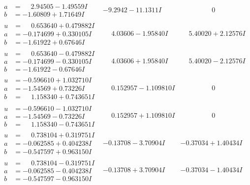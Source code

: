 \documentclass[1p]{elsarticle_modified}
\theoremstyle{definition}
\begin{document}
$$\begin{array}{c|c|c}
\begin{aligned}
a &= \phantom{-}2.94505 - 1.49559 I \\
b &= -1.60809 + 1.71649 I\end{aligned}
 & -9.2942 - 11.1311 I & \phantom{-0.000000 } 0 \\ \hline\begin{aligned}
u &= \phantom{-}0.653640 + 0.479882 I \\
a &= -0.174699 + 0.330105 I \\
b &= -1.61922 + 0.67646 I\end{aligned}
 & \phantom{-}4.03606 - 1.95840 I & \phantom{-}5.40020 + 2.12576 I \\ \hline\begin{aligned}
u &= \phantom{-}0.653640 - 0.479882 I \\
a &= -0.174699 - 0.330105 I \\
b &= -1.61922 - 0.67646 I\end{aligned}
 & \phantom{-}4.03606 + 1.95840 I & \phantom{-}5.40020 - 2.12576 I \\ \hline\begin{aligned}
u &= -0.596610 + 1.032710 I \\
a &= -1.54569 + 0.73226 I \\
b &= \phantom{-}1.158340 + 0.743651 I\end{aligned}
 & \phantom{-}0.152957 - 1.109810 I & \phantom{-0.000000 } 0 \\ \hline\begin{aligned}
u &= -0.596610 - 1.032710 I \\
a &= -1.54569 - 0.73226 I \\
b &= \phantom{-}1.158340 - 0.743651 I\end{aligned}
 & \phantom{-}0.152957 + 1.109810 I & \phantom{-0.000000 } 0 \\ \hline\begin{aligned}
u &= \phantom{-}0.738104 + 0.319751 I \\
a &= -0.062585 + 0.404238 I \\
b &= -0.547597 + 0.963150 I\end{aligned}
 & -0.13708 - 3.70904 I & -0.37034 + 1.40434 I \\ \hline\begin{aligned}
u &= \phantom{-}0.738104 - 0.319751 I \\
a &= -0.062585 - 0.404238 I \\
b &= -0.547597 - 0.963150 I\end{aligned}
 & -0.13708 + 3.70904 I & -0.37034 - 1.40434 I\\

\end{array}$$
\end{document}
